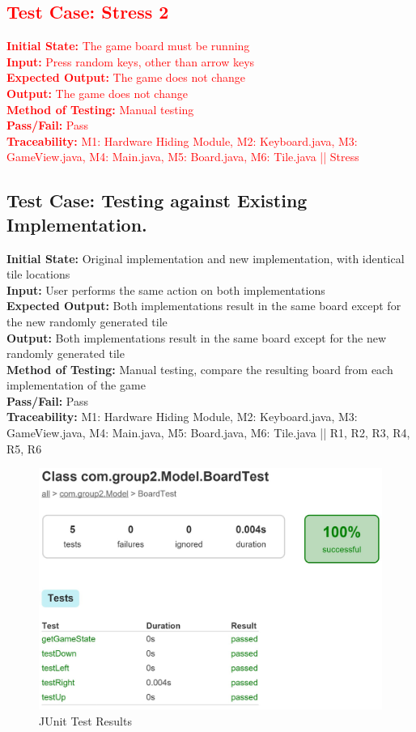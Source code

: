 \documentclass[12pt]{article}
\begin{document}
\subsection{\textcolor{red}{Test Case: Stress 2}}
\textcolor{red}{
\textbf{Initial State:} The game board must be running\\
\textbf{Input:} Press random keys, other than arrow keys\\
\textbf{Expected Output:} The game does not change\\
\textbf{Output:} The game does not change\\
\textbf{Method of Testing:} Manual testing\\
\textbf{Pass/Fail:} Pass\\
\textbf{Traceability:} M1: Hardware Hiding Module, M2: Keyboard.java, M3: GameView.java, M4: Main.java, M5: Board.java, M6: Tile.java || Stress}

\subsection{Test Case: Testing against Existing Implementation.}
\textbf{Initial State:} Original implementation and new implementation, with identical tile locations\\
\textbf{Input:} User performs the same action on both implementations\\
\textbf{Expected Output:} Both implementations result in the same board except for the new randomly generated tile\\
\textbf{Output:} Both implementations result in the same board except for the new randomly generated tile\\
\textbf{Method of Testing:} Manual testing, compare the resulting board from each implementation of the game\\
\textbf{Pass/Fail:} Pass\\
\textbf{Traceability:} M1: Hardware Hiding Module, M2: Keyboard.java, M3: GameView.java, M4: Main.java, M5: Board.java, M6: Tile.java || R1, R2, R3, R4, R5, R6

\begin{figure}[H]
	\centering
	\includegraphics[width = 14cm]{JUnit_Test_Results}
	\caption{JUnit Test Results}
	\label{JUnit Test Results}
\end{figure}
\end{document}
